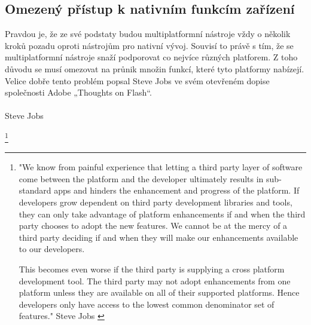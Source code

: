 \subsection{Omezený přístup k nativním funkcím zařízení}
Pravdou je, že ze své podstaty budou multiplatformní nástroje vždy o několik kroků pozadu oproti nástrojům pro nativní vývoj. Souvisí to právě s tím, že se multiplatformní nástroje snaží podporovat co nejvíce různých platforem. Z toho důvodu se musí omezovat na průnik množin funkcí, které tyto platformy nabízejí. Velice dobře tento problém popsal Steve Jobs ve svém otevřeném dopise společnosti Adobe „Thoughts on Flash“.
\\ \\
\textit{} Steve Jobs \cite{thoughts_on_flash}

\footnote{"We know from painful experience that letting a third party layer of software come between the platform and the developer ultimately results in sub-standard apps and hinders the enhancement and progress of the platform. If developers grow dependent on third party development libraries and tools, they can only take advantage of platform enhancements if and when the third party chooses to adopt the new features. We cannot be at the mercy of a third party deciding if and when they will make our enhancements available to our developers.

This becomes even worse if the third party is supplying a cross platform development tool. The third party may not adopt enhancements from one platform unless they are available on all of their supported platforms. Hence developers only have access to the lowest common denominator set of features." Steve Jobs \cite{thoughts_on_flash}}

